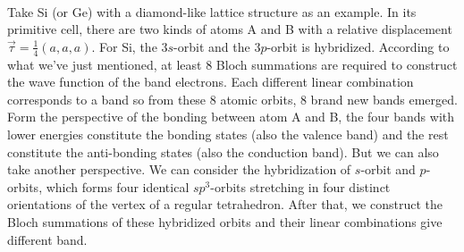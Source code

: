 \documentclass{article}
\begin{document}
\\
Take Si (or Ge) with a diamond-like lattice structure as an example. In its primitive cell, there are two kinds of atoms A and B with a relative displacement $\vec\tau=\frac14(a,a,a)$. For Si, the $3s$-orbit and the $3p$-orbit is hybridized. According to what we've just mentioned, at least 8 Bloch summations are required to construct the wave function of the band electrons. Each different linear combination corresponds to a band so from these 8 atomic orbits, 8 brand new bands emerged. Form the perspective of the bonding between atom A and B, the four bands with lower energies constitute the bonding states (also the valence band) and the rest constitute the anti-bonding states (also the conduction band). But we can also take another perspective. We can consider the hybridization of $s$-orbit and $p$-orbits, which forms four identical $sp^3$-orbits stretching in four distinct orientations of the vertex of a regular tetrahedron. After that, we construct the Bloch summations of these hybridized orbits and their linear combinations give different band.\\
\\
\end{document}
